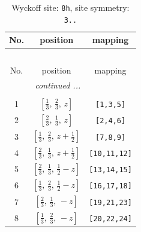 \documentclass[fleqn,8pt]{jsarticle}
\begin{document}
\begin{longtable}{ccc}
\caption{Wyckoff site: {\tt 8h}, site symmetry: {\tt 3..}}
 \\
 \hline \hline
No. & position & mapping \\ \hline \endfirsthead

\multicolumn{2}{l}{\tablename\ \thetable{}} \\
 \hline \hline
No. & position & mapping \\ \hline \endhead

 \hline \hline
\multicolumn{2}{r}{\footnotesize\it continued ...} \\ \endfoot

 \hline \hline
\multicolumn{2}{r}{} \\ \endlastfoot

1 & $\left[ \frac{1}{3},\, \frac{2}{3},\, z \right]$ & {\tt [1,3,5]} \\ \hline
2 & $\left[ \frac{2}{3},\, \frac{1}{3},\, z \right]$ & {\tt [2,4,6]} \\ \hline
3 & $\left[ \frac{1}{3},\, \frac{2}{3},\, z + \frac{1}{2} \right]$ & {\tt [7,8,9]} \\ \hline
4 & $\left[ \frac{2}{3},\, \frac{1}{3},\, z + \frac{1}{2} \right]$ & {\tt [10,11,12]} \\ \hline
5 & $\left[ \frac{2}{3},\, \frac{1}{3},\, \frac{1}{2} - z \right]$ & {\tt [13,14,15]} \\ \hline
6 & $\left[ \frac{1}{3},\, \frac{2}{3},\, \frac{1}{2} - z \right]$ & {\tt [16,17,18]} \\ \hline
7 & $\left[ \frac{2}{3},\, \frac{1}{3},\, - z \right]$ & {\tt [19,21,23]} \\ \hline
8 & $\left[ \frac{1}{3},\, \frac{2}{3},\, - z \right]$ & {\tt [20,22,24]} \\
\end{longtable}
\renewcommand{\arraystretch}{1.2}
\end{document}
